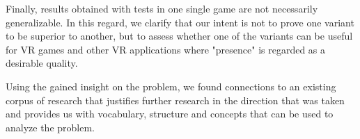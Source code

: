 Finally, results obtained with tests in one single game are not necessarily generalizable. In this regard, we clarify that our intent is not to prove one variant to be superior to another, but to assess whether one of the variants can be useful for VR games and other VR applications where "presence" is regarded as a desirable quality.

Using the gained insight on the problem, we found connections to an existing corpus of research that justifies further research in the direction that was taken and provides us with vocabulary, structure and concepts that can be used to analyze the problem.
